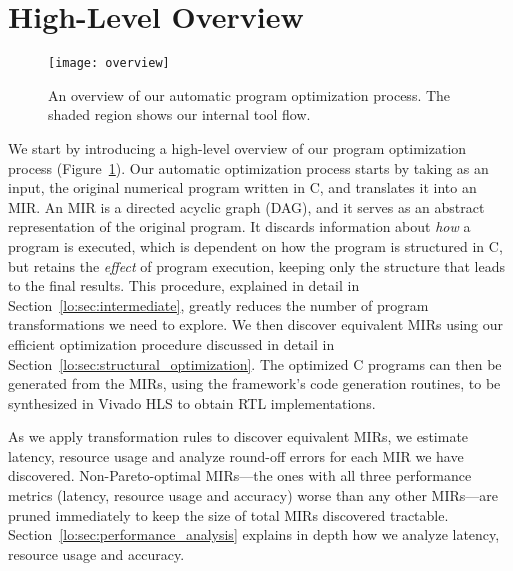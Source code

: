 \section{High-Level Overview}
\label{lo:sec:overview}

\begin{figure}[ht]
    \centering
    \texttt{[image: overview]}
    \caption{%
        An overview of our automatic program optimization process. The shaded
        region shows our internal tool flow.
    }\label{lo:fig:overview}
\end{figure}

We start by introducing a high-level overview of our program optimization
process (Figure~\ref{lo:fig:overview}).  Our automatic optimization process
starts by taking as an input, the original numerical program written in C, and
translates it into an MIR\@.  An MIR is a directed acyclic graph (DAG), and
it serves as an abstract representation of the original program.  It discards
information about \emph{how} a program is executed, which is dependent on
how the program is structured in C, but retains the \emph{effect} of program
execution, keeping only the structure that leads to the final results.  This
procedure, explained in detail in Section~\ref{lo:sec:intermediate}, greatly
reduces the number of program transformations we need to explore.  We then
discover equivalent MIRs using our efficient optimization procedure discussed
in detail in Section~\ref{lo:sec:structural_optimization}.  The optimized C
programs can then be generated from the MIRs, using the \SOAP{} framework's
code generation routines, to be synthesized in Vivado HLS to obtain RTL
implementations.

As we apply transformation rules to discover equivalent MIRs, we estimate
latency, resource usage and analyze round-off errors for each MIR we have
discovered.  Non-Pareto-optimal MIRs---the ones with all three performance
metrics (latency, resource usage and accuracy) worse than any other MIRs---are
pruned immediately to keep the size of total MIRs discovered tractable.
Section~\ref{lo:sec:performance_analysis} explains in depth how we analyze
latency, resource usage and accuracy.
